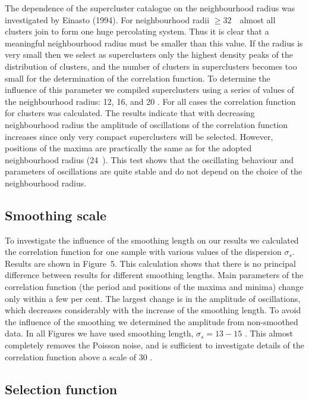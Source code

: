 The dependence of the supercluster catalogue on the neighbourhood radius was
investigated by Einasto \etal (1994). For neighbourhood radii $\ge 32$~\Mpc\ 
almost all clusters join to form one huge percolating system. Thus it is clear
that a meaningful neighbourhood radius must be smaller than this value. If the
radius is very small then we select as superclusters only the highest density
peaks of the distribution of clusters, and the number of clusters in
superclusters becomes too small for the determination of the correlation
function.  To determine the influence of this parameter we compiled
superclusters using a series of values of the neighbourhood radius: 12, 16,
and 20 \Mpc. For all cases the correlation function for clusters was
calculated. The results indicate that with decreasing neighbourhood radius the
amplitude of oscillations of the correlation function increases since only
very compact superclusters will be selected. However, positions of the maxima
are practically the same as for the adopted neighbourhood radius (24~\Mpc).
This test shows that the oscillating behaviour and parameters of oscillations
are quite stable and do not depend on the choice of the neighbourhood radius.

\subsection{ Smoothing scale}

To investigate the influence of the smoothing length on our results we
calculated the correlation function for one sample with various values
of the dispersion $\sigma_{s}$. Results are shown in Figure~5. This
calculation shows that there is no principal difference between
results for different smoothing lengths. Main parameters of the
correlation function (the period and positions of the maxima and
minima) change only within a few per cent. The largest change is in the
amplitude of oscillations, which decreases considerably with the
increase of the smoothing length. To avoid the influence of the
smoothing  we determined the amplitude from non-smoothed data.
In all Figures we have used smoothing length, $\sigma_{s}=13 - 15$ \Mpc.
This almost completely removes the Poisson noise, and is sufficient
to investigate details of the correlation function above a scale of 30
\Mpc.


\subsection{ Selection function}

